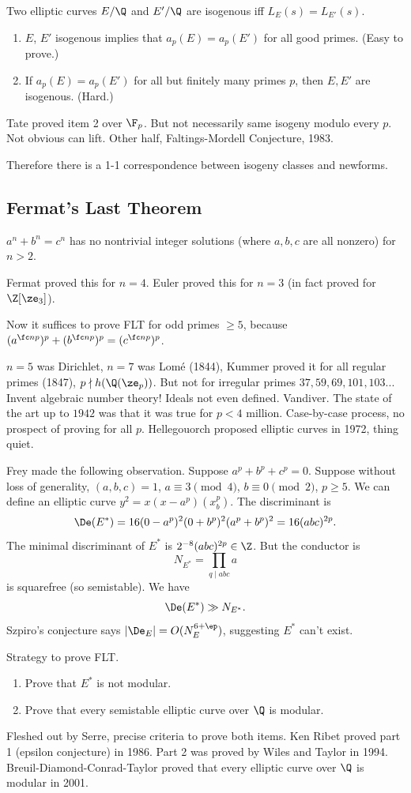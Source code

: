 \begin{thm}
Two elliptic curves $E/\Q$ and $E'/\Q$ are isogenous iff $L_E(s)=L_{E'}(s)$.
\begin{enumerate}
\item
$E$, $E'$ isogenous implies that $a_p(E)=a_p(E')$ for all good primes. (Easy to prove.)
\item
If $a_p(E)=a_p(E')$ for all but finitely many primes $p$, then $E,E'$ are isogenous. (Hard.)
\end{enumerate}
\end{thm}
Tate proved item 2 over $\F_p$. But not necessarily same isogeny modulo every $p$. Not obvious can lift. Other half, Faltings-Mordell Conjecture, 1983.

Therefore there is a 1-1 correspondence between isogeny classes and newforms.
\subsection{Fermat's Last Theorem}
\begin{thm}
$a^n+b^n=c^n$ has no nontrivial integer solutions (where $a,b,c$ are all nonzero) for $n>2$.
\end{thm}
Fermat proved this for $n=4$. Euler proved this for $n=3$ (in fact proved for $\Z[\ze_3]$).

Now it suffices to prove FLT for odd primes $\ge 5$, because $(a^{\fc np})^p+(b^{\fc np})^p=(c^{\fc np})^p$.

$n=5$ was Dirichlet, $n=7$ was Lom\'e (1844), Kummer proved it for all regular primes (1847), $p\nmid h(\Q(\ze_p))$. But not for irregular primes $37,59,69, 101, 103...$ Invent algebraic number theory! Ideals not even defined. Vandiver. The state of the art up to $1942$ was that it was true for $p<4$ million. Case-by-case process, no prospect of proving for all $p$. Hellegouorch proposed elliptic curves in 1972, thing quiet.

Frey made the following observation. Suppose $a^p+b^p+c^p=0$. Suppose without loss of generality, $(a,b,c)=1$, $a\equiv 3\pmod 4$, $b\equiv 0\pmod 2$, $p\ge 5$. We can define an elliptic curve $y^2=x(x-a^p)(x_b^p)$. The discriminant is
\[
\De(E^*)=16(0-a^p)^2(0+b^p)^2(a^p+b^p)^2=16(abc)^{2p}.
\]
The minimal discriminant of $E^*$ is $2^{-8}(abc)^{2p}\in \Z$. But the conductor is 
\[N_{E^*}=\prod_{q\mid abc} a\]
is squarefree (so semistable). 
We have
\[
\De(E^*)\gg N_{E^*}.
\]
Szpiro's conjecture says $|\De_E|=O(N_E^{6+\ep})$, suggesting $E^*$ can't exist.

Strategy to prove FLT.
\begin{enumerate}
\item
Prove that $E^*$ is not modular. %
\item
Prove that every semistable elliptic curve over $\Q$ is modular.
\end{enumerate}
Fleshed out by Serre, precise criteria to prove both items. Ken Ribet proved part 1 (epsilon conjecture) in 1986. Part 2 was proved by Wiles and Taylor in 1994. Breuil-Diamond-Conrad-Taylor proved that every elliptic curve over $\Q$ is modular in 2001.

